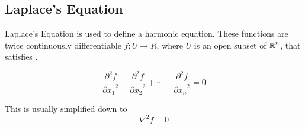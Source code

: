 \subsection{Laplace's Equation}\label{subsec:Laplaces_Equation}
Laplace's Equation is used to define a harmonic equation.
These functions are twice continuously differentiable $f: U \to R$, where $U$ is an open subset of $\operatorname{\mathbb{R}}^{n}$, that satisfies .

\begin{equation}\label{eq:Laplaces_Equation}
  \frac{\partial^{2} f}{{\partial x_{1}}^{2}} + \frac{\partial^{2} f}{{\partial x_{2}}^{2}} + \cdots + \frac{\partial^{2} f}{{\partial x_{n}}^{2}} = 0
\end{equation}

This is usually simplified down to
\begin{equation}\label{eq:Laplaces_Equation-Nabla}
  \nabla^{2} f = 0
\end{equation}

